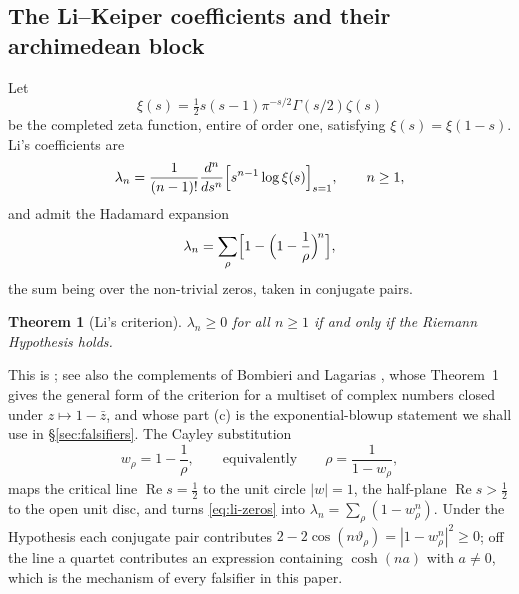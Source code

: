 \documentclass[11pt]{amsart}
\newtheorem{theorem}{Theorem}[section]
\theoremstyle{definition}
\theoremstyle{remark}
\theoremstyle{definition}
\renewcommand{\Re}{\operatorname{Re}}
\newcommand{\half}{\tfrac{1}{2}}
\begin{document}
\subsection{The Li--Keiper coefficients and their archimedean block}\label{sec:li}

Let
\[
   \xi(s)=\half s(s-1)\pi^{-s/2}\Gamma(s/2)\zeta(s)
\]
be the completed zeta function, entire of order one, satisfying $\xi(s)=\xi(1-s)$. Li's
coefficients \cite{Li1997} are
\[
   \lambda_n=\frac{1}{(n-1)!}\frac{d^n}{ds^n}
   \Bigl[s^{n-1}\log\xi(s)\Bigr]_{s=1},\qquad n\ge1,
\]
and admit the Hadamard expansion
\begin{equation}\label{eq:li-zeros}
   \lambda_n=\sum_\rho\Bigl[1-\Bigl(1-\frac1\rho\Bigr)^{\!n}\Bigr],
\end{equation}
the sum being over the non-trivial zeros, taken in conjugate pairs.

\begin{theorem}[Li's criterion]\label{thm:li}
$\lambda_n\ge0$ for all $n\ge1$ if and only if the Riemann Hypothesis holds.
\end{theorem}

This is \cite{Li1997}; see also the complements of Bombieri and Lagarias \cite{BombieriLagarias1999},
whose Theorem~1 gives the general form of the criterion for a multiset of complex numbers closed
under $z\mapsto1-\bar z$, and whose part (c) is the exponential-blowup statement we shall use in
\S\ref{sec:falsifiers}. The Cayley substitution
\begin{equation}\label{eq:cayley}
   w_\rho=1-\frac1\rho,\qquad\text{equivalently}\qquad \rho=\frac{1}{1-w_\rho},
\end{equation}
maps the critical line $\Re s=\half$ to the unit circle $|w|=1$, the half-plane
$\Re s>\half$ to the open unit disc, and turns \eqref{eq:li-zeros} into
$\lambda_n=\sum_\rho(1-w_\rho^n)$. Under the Hypothesis each conjugate pair contributes
$2-2\cos(n\vartheta_\rho)=|1-w_\rho^n|^2\ge0$; off the line a quartet contributes an expression
containing $\cosh(na)$ with $a\ne0$, which is the mechanism of every falsifier in this paper.
\end{document}
